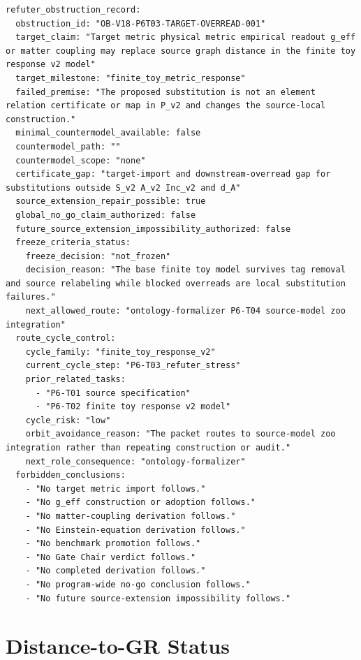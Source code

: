 \documentclass[11pt]{article}
\begin{document}
\begin{verbatim}
refuter_obstruction_record:
  obstruction_id: "OB-V18-P6T03-TARGET-OVERREAD-001"
  target_claim: "Target metric physical metric empirical readout g_eff or matter coupling may replace source graph distance in the finite toy response v2 model"
  target_milestone: "finite_toy_metric_response"
  failed_premise: "The proposed substitution is not an element relation certificate or map in P_v2 and changes the source-local construction."
  minimal_countermodel_available: false
  countermodel_path: ""
  countermodel_scope: "none"
  certificate_gap: "target-import and downstream-overread gap for substitutions outside S_v2 A_v2 Inc_v2 and d_A"
  source_extension_repair_possible: true
  global_no_go_claim_authorized: false
  future_source_extension_impossibility_authorized: false
  freeze_criteria_status:
    freeze_decision: "not_frozen"
    decision_reason: "The base finite toy model survives tag removal and source relabeling while blocked overreads are local substitution failures."
    next_allowed_route: "ontology-formalizer P6-T04 source-model zoo integration"
  route_cycle_control:
    cycle_family: "finite_toy_response_v2"
    current_cycle_step: "P6-T03_refuter_stress"
    prior_related_tasks:
      - "P6-T01 source specification"
      - "P6-T02 finite toy response v2 model"
    cycle_risk: "low"
    orbit_avoidance_reason: "The packet routes to source-model zoo integration rather than repeating construction or audit."
    next_role_consequence: "ontology-formalizer"
  forbidden_conclusions:
    - "No target metric import follows."
    - "No g_eff construction or adoption follows."
    - "No matter-coupling derivation follows."
    - "No Einstein-equation derivation follows."
    - "No benchmark promotion follows."
    - "No Gate Chair verdict follows."
    - "No completed derivation follows."
    - "No program-wide no-go conclusion follows."
    - "No future source-extension impossibility follows."
\end{verbatim}

\section{Distance-to-GR Status}
\end{document}
